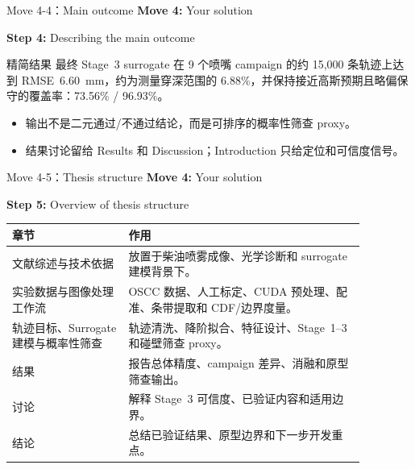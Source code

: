 \documentclass[aspectratio=169,11pt]{beamer}
\newcommand{\movetag}[2]{\textbf{Move #1:} #2}
\newcommand{\steptag}[2]{\textbf{Step #1:} #2}
\begin{document}
\begin{frame}{Move 4-4：Main outcome}
\footnotesize
\movetag{4}{Your solution}

\vspace{0.5em}
\steptag{4}{Describing the main outcome}

\vspace{0.5em}
\begin{block}{精简结果}
最终 Stage~3 surrogate 在 9 个喷嘴 campaign 的约 15{,}000 条轨迹上达到 RMSE~\SI{6.60}{mm}，约为测量穿深范围的 6.88\%，并保持接近高斯预期且略偏保守的覆盖率：73.56\% / 96.93\%。
\end{block}

\vspace{0.4em}
\begin{itemize}
  \item 输出不是二元通过/不通过结论，而是可排序的概率性筛查 proxy。
  \item 结果讨论留给 Results 和 Discussion；Introduction 只给定位和可信度信号。
\end{itemize}
\end{frame}

\begin{frame}{Move 4-5：Thesis structure}
\scriptsize
\movetag{4}{Your solution}

\vspace{0.5em}
\steptag{5}{Overview of thesis structure}

\vspace{0.6em}
\begin{tabular}{L{0.29\linewidth}L{0.58\linewidth}}
\toprule
章节 & 作用 \\
\midrule
文献综述与技术依据 & 放置于柴油喷雾成像、光学诊断和 surrogate 建模背景下。 \\
实验数据与图像处理工作流 & OSCC 数据、人工标定、CUDA 预处理、配准、条带提取和 CDF/边界度量。 \\
轨迹目标、Surrogate 建模与概率性筛查 & 轨迹清洗、降阶拟合、特征设计、Stage~1--3 和碰壁筛查 proxy。 \\
结果 & 报告总体精度、campaign 差异、消融和原型筛查输出。 \\
讨论 & 解释 Stage~3 可信度、已验证内容和适用边界。 \\
结论 & 总结已验证结果、原型边界和下一步开发重点。 \\
\bottomrule
\end{tabular}
\end{frame}
\end{document}
